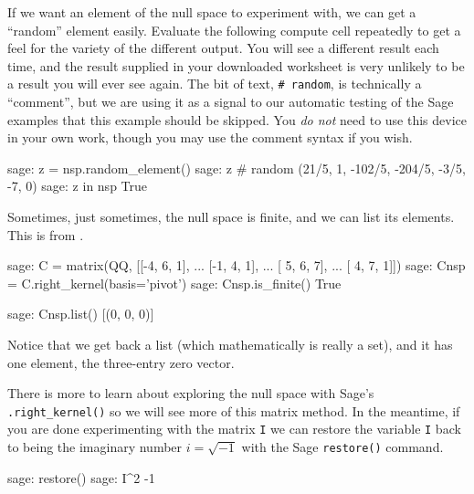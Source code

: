 %
If we want an element of the null space to experiment with, we can get a ``random'' element easily.  Evaluate the following compute cell repeatedly to get a feel for the variety of the different output.  You will see a different result each time, and the result supplied in your downloaded worksheet is very unlikely to be a result you will ever see again.  The bit of text, \verb!# random!, is technically a ``comment'', but we are using it as a signal to our automatic testing of the Sage examples that this example should be skipped.  You \emph{do not} need to use this device in your own work, though you may use the comment syntax if you wish.
%
\begin{sageexample}
sage: z = nsp.random_element()
sage: z                       # random
(21/5, 1, -102/5, -204/5, -3/5, -7, 0)
sage: z in nsp
True
\end{sageexample}
%
Sometimes, just sometimes, the null space is finite, and we can list its elements.  This is from .
%
\begin{sageexample}
sage: C = matrix(QQ, [[-4, 6, 1],
...                   [-1, 4, 1],
...                   [ 5, 6, 7],
...                   [ 4, 7, 1]])
sage: Cnsp = C.right_kernel(basis='pivot')
sage: Cnsp.is_finite()
True
\end{sageexample}
%
\begin{sageexample}
sage: Cnsp.list()
[(0, 0, 0)]
\end{sageexample}
%
Notice that we get back a list (which mathematically is really a set), and it has one element, the three-entry zero vector.\par
%
There is more to learn about exploring the null space with Sage's \verb?.right_kernel()? so we will see more of this matrix method.  In the meantime, if you are done experimenting with the matrix \verb?I? we can restore the variable \verb?I? back to being the imaginary number $i = \sqrt{-1}$ with the Sage \verb?restore()? command.
%
\begin{sageexample}
sage: restore()
sage: I^2
-1
\end{sageexample}
%
%
\begin{sageverbatim}
\end{sageverbatim}
%

